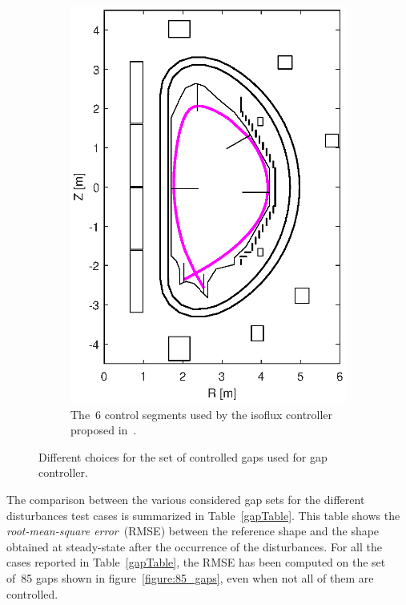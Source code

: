 \begin{figure}[h]
\begin{subfigure}[b]{0.32\textwidth}
		\includegraphics[width=\textwidth]{Chp3/6_gaps.eps} 
		\caption{ The~6 control segments used by the isoflux controller proposed in~\cite{Miyata:2014}. \label{figure:6_gaps}}
	\end{subfigure}
	
\caption{Different choices for the set of controlled gaps used for gap controller.} \label{figure:gapChoices}
\end{figure}


The comparison between the various considered gap sets for the different disturbances test cases is summarized in Table~\ref{gapTable}. This table shows the \emph{root-mean-square error}~(RMSE) between the reference shape and the shape obtained at steady-state after the occurrence of the disturbances. For all the cases reported in Table~\ref{gapTable}, the RMSE has been computed on the set of~85 gaps shown in figure~\ref{figure:85_gaps}, even when not all of them are controlled. \smallskip

